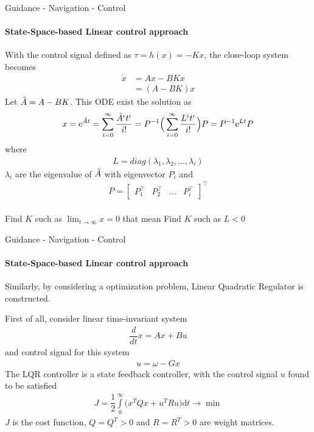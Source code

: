 \begin{frame}{Guidance - Navigation - Control}
	\framesubtitle{State-Space-based Linear control approach}
	With the control signal defined as $\tau = h({x}) = -{K}{x}$, the close-loop system becomes
	\begin{align}
		\Dot{{x}} &= {A}{x} - {B}{K}{x} \\
		& = ({A} - {B}{K}){x}
	\end{align}
	Let $\Tilde{{A}} = {A} - {B}{K}$. This ODE exist the solution as
	\begin{align}
		{x} = \text{e}^{\Tilde{{A}}t} = \sum\limits_{i = 0}^{\infty}\dfrac{\Tilde{{A}}^it^i}{i!} = {P}^{-1}\Big(\sum\limits_{i = 0}^{\infty}\dfrac{{L}^it^i}{i!} \Big) {P}=  {P}^{-1}\text{e}^{{L}t} {P}
	\end{align}
	where 
	\begin{align}
		{L} = diag(\lambda_1, \lambda_2, ..., \lambda_i)
	\end{align}
	$\lambda_i$ are the eigenvalue of $\Tilde{{A}}$ with eigenvector ${P}_i$ and
	\begin{align}
		{P} = \begin{bmatrix}
			{P}_1^\top & {P}_2^\top & ... & {P}_i^\top
		\end{bmatrix}^\top
	\end{align}\\
	{\color{red} Find ${K}$ such as $\lim_{t \to \infty}{x} = 0$ that mean Find ${K}$ such as ${L} < 0$}
\end{frame}









\begin{frame}{Guidance - Navigation - Control}
	\framesubtitle{State-Space-based Linear control approach}
	{\color{red} Similarly, by considering a optimization problem, Linear Quadratic Regulator is constructed.}
	
	
	First of all, consider linear time-invariant system
	\begin{align}
		\dfrac{d}{dt}{x} = {A}{x} + {B}u
	\end{align}
	and control signal for this system
	\begin{align}
		{u} = {\omega} - G{x}
	\end{align}
	The LQR controller is a state feedback controller, with the control signal $u$ found to be satisfied
	\begin{align}
		J = \dfrac{1}{2}\int\limits_{0}^\infty\Big({x}^T{Q}{x} + {u}^T{Ru}\Big)\text{d}t \to \min \label{eqn:cost_function}
	\end{align}
	$J$ is the cost function, ${Q} = {Q}^T > 0$ and ${R} = {R}^T > 0$ are weight matrices.
\end{frame}




